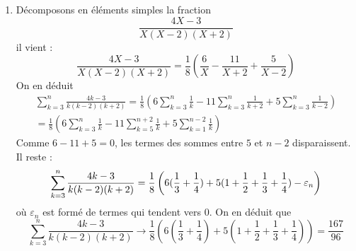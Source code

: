 \begin{enumerate}
\item[ ]  D{\'e}composons en {\'e}l{\'e}ments simples la fraction 
\begin{displaymath}
\frac{4X-3}{X(X-2)(X+2)} 
\end{displaymath}
il vient :
\[
\frac{4X-3}{X(X-2)(X+2)}=\frac{1}{8}\left( \frac{6}{X}-\frac{11}{X+2}+\frac{5%
}{X-2}\right)
\]
On en d{\'e}duit
\begin{multline*}
\sum_{k=3}^{n}\frac{4k-3}{k(k-2)(k+2)} 
= \frac{1}{8}\left( 6\sum_{k=3}^{n}\frac{1}{k}-11\sum_{k=3}^{n}\frac{1}{k+2}+5\sum_{k=3}^{n}\frac{1}{k-2}\right)
\\
= \frac{1}{8}\left( 6\sum_{k=3}^{n}\frac{1}{k}-11\sum_{k=5}^{n+2}\frac{1}{k}+5\sum_{k=1}^{n-2}\frac{1}{k}\right)
\end{multline*}
Comme $6-11+5=0$, les termes des sommes entre $5$ et $n-2$
disparaissent. Il reste :
\[
\sum_{k=3}^{n}\frac{4k-3}{k(k-2)(k+2)}=\frac{1}{8}\left( 6(\frac{1}{3}+\frac{%
1}{4})+5(1+\frac{1}{2}+\frac{1}{3}+\frac{1}{4})-\varepsilon
_{n}\right)
\]
o{\`u} $\varepsilon _{n}$ est form{\'e} de termes qui tendent vers 0. On
en d{\'e}duit que
\[
\sum_{k=3}^{n}\frac{4k-3}{k(k-2)(k+2)}\rightarrow \frac{1}{8}\left( 6(\frac{1%
}{3}+\frac{1}{4})+5(1+\frac{1}{2}+\frac{1}{3}+\frac{1}{4})\right) =\frac{167%
}{96}
\]
\end{enumerate}
